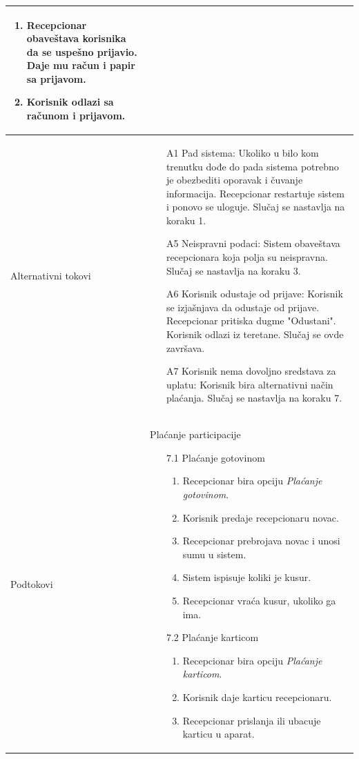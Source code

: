 \documentclass[../../main.tex]{subfiles}
\begin{document}
\begin{longtable}{| p{} | p{} |}
\begin{enumerate}
        \item Recepcionar obaveštava korisnika da se uspešno prijavio. Daje mu račun i papir sa prijavom.
        \item Korisnik odlazi sa računom i prijavom.
    \end{enumerate}\\
\hline
    Alternativni tokovi & \begin{itemize}
        \item[A1] Pad sistema: Ukoliko u bilo kom trenutku dođe do pada sistema potrebno je obezbediti oporavak i čuvanje informacija. Recepcionar restartuje sistem i ponovo se uloguje. Slučaj se nastavlja na koraku 1.
        \item[A5] Neispravni podaci: Sistem obaveštava recepcionara koja polja su neispravna. Slučaj se nastavlja na koraku 3.
        \item[A6] Korisnik odustaje od prijave: Korisnik se izjašnjava da odustaje od prijave. Recepcionar pritiska dugme "Odustani". Korisnik odlazi iz teretane. Slučaj se ovde završava.
        \item[A7] Korisnik nema dovoljno sredstava za uplatu: Korisnik bira alternativni način plaćanja. Slučaj se nastavlja na koraku 7.
    \end{itemize}\\
\hline
    Podtokovi & Plaćanje participacije\begin{itemize}
        \item[7.1] Plaćanje gotovinom \begin{enumerate}
            \item Recepcionar bira opciju \textit{Plaćanje gotovinom}.
            \item Korisnik predaje recepcionaru novac.
            \item Recepcionar prebrojava novac i unosi sumu u sistem.
            \item Sistem ispisuje koliki je kusur.
            \item Recepcionar vraća kusur, ukoliko ga ima.
        \end{enumerate} 
        \item[7.2] Plaćanje karticom \begin{enumerate}
            \item Recepcionar bira opciju \textit{Plaćanje karticom}.
            \item Korisnik daje karticu recepcionaru.
            \item Recepcionar prislanja ili ubacuje karticu u aparat.

\end{enumerate}
\end{itemize}
\end{longtable}
\end{document}
